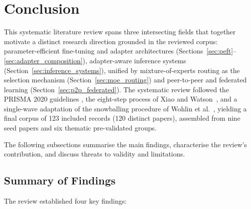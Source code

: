 \section{Conclusion}
\label{sec:conclusion}

This systematic literature review spans three intersecting fields
that together motivate a distinct research direction grounded in the reviewed
corpus: parameter-efficient fine-tuning
and adapter architectures (Sections~\ref{sec:peft}--\ref{sec:adapter_composition}),
adapter-aware inference systems (Section~\ref{sec:inference_systems}), unified by
mixture-of-experts routing as the selection mechanism (Section~\ref{sec:moe_routing}) and
peer-to-peer and federated learning (Section~\ref{sec:p2p_federated}).
The systematic review followed the PRISMA 2020 guidelines \cite{Page2021}, the
eight-step process of Xiao and Watson~\cite{XiaoWatson2019}, and a single-wave
adaptation of the snowballing procedure of
Wohlin et al.~\cite{Wohlin2014}, yielding a final corpus of 123 included
records (120 distinct papers), assembled from nine seed papers and six
thematic pre-validated groups.

The following subsections summarise the main findings, characterise the review's contribution, and discuss threats to validity and limitations.

\subsection{Summary of Findings}
\label{sec:conclusion:summary}

The review established four key findings:

